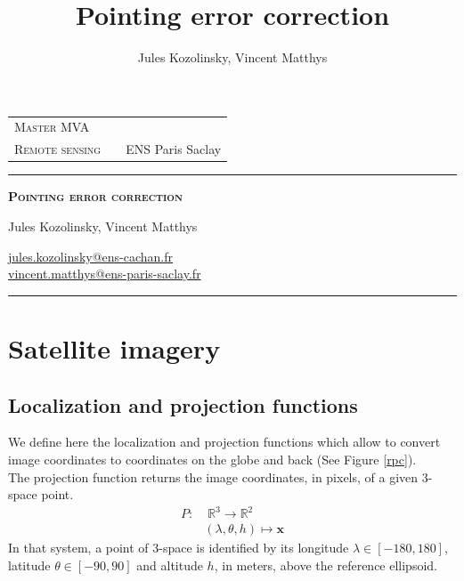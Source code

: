 \documentclass[paper=a4, fontsize=11pt, onecolumn, tikz, dvipsnames, svgnames, x11names]{article}
\title{\normalfont \normalsize \huge Pointing error correction}
\author{Jules Kozolinsky, Vincent Matthys}
\date{}
\begin{document}

 \begin{tabularx}{0.9\textwidth}{@{} l X r @{} }
 	{\textsc{Master MVA}}  &  & \textsc{} \\
 	\textsc{Remote sensing} &  & {ENS Paris Saclay}       \\
 \end{tabularx}
 \vspace{1.5cm}
 \begin{center}

 	\rule[11pt]{5cm}{0.5pt}

 	\textbf{\LARGE \textsc{Pointing error correction}}
 	\vspace{0.5cm}

 	Jules Kozolinsky,
 	Vincent Matthys

 	\href{mailto:jules.kozolinsky@ens-cachan.fr}{jules.kozolinsky@ens-cachan.fr} \\
 	\href{mailto:vincent.matthys@ens-paris-saclay.fr}{vincent.matthys@ens-paris-saclay.fr}

 	\rule{5cm}{0.5pt}

 	\vspace{1.5cm}
 \end{center}

 \tableofcontents


\section{Satellite imagery}
\subsection{Localization and projection functions}
We define here the localization and projection functions which allow to convert image coordinates to coordinates
on the globe and back (See Figure \ref{rpc}).\\


The projection function returns the image coordinates, in pixels, of a given 3-space
point.
\begin{align*}
P:&\; \mathbb{R}^3\to\mathbb{R}^2\\
&(\lambda, \theta, h) \mapsto \textbf{x}
\end{align*}
In that system, a point of 3-space is identified by its
longitude $\lambda\in[-180,180]$, latitude $\theta\in[-90,90]$ and
altitude $h$, in meters, above the reference ellipsoid.\\
\end{document}

